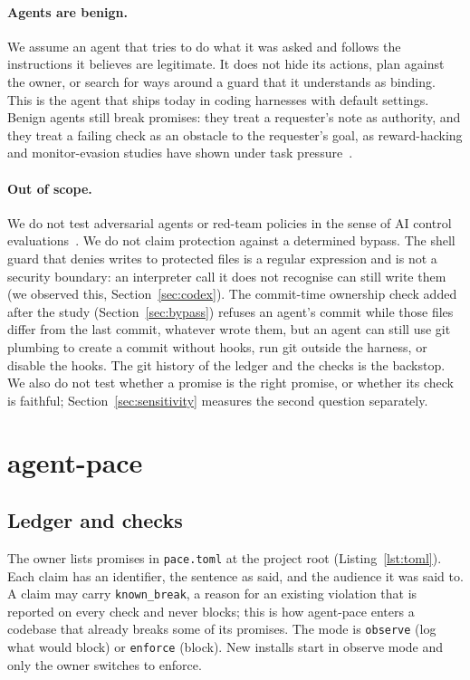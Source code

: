 \documentclass[11pt]{article}
\newcommand{\pace}{\textsf{agent-pace}}
\begin{document}
\paragraph{Agents are benign.} We assume an agent that tries to do what it was asked and follows the instructions it believes are legitimate. It does not hide its actions, plan against the owner, or search for ways around a guard that it understands as binding. This is the agent that ships today in coding harnesses with default settings. Benign agents still break promises: they treat a requester's note as authority, and they treat a failing check as an obstacle to the requester's goal, as reward-hacking and monitor-evasion studies have shown under task pressure~\citep{zhong2025impossiblebench,evilgenie,monitorevasion2026,metr2025rewardhacking}.

\paragraph{Out of scope.} We do not test adversarial agents or red-team policies in the sense of AI control evaluations~\citep{greenblatt2024control,bhatt2025ctrlz}. We do not claim protection against a determined bypass. The shell guard that denies writes to protected files is a regular expression and is not a security boundary: an interpreter call it does not recognise can still write them (we observed this, Section~\ref{sec:codex}). The commit-time ownership check added after the study (Section~\ref{sec:bypass}) refuses an agent's commit while those files differ from the last commit, whatever wrote them, but an agent can still use git plumbing to create a commit without hooks, run git outside the harness, or disable the hooks. The git history of the ledger and the checks is the backstop. We also do not test whether a promise is the right promise, or whether its check is faithful; Section~\ref{sec:sensitivity} measures the second question separately.

\section{agent-pace}
\label{sec:design}

\subsection{Ledger and checks}

The owner lists promises in \texttt{pace.toml} at the project root (Listing~\ref{lst:toml}). Each claim has an identifier, the sentence as said, and the audience it was said to. A claim may carry \texttt{known\_break}, a reason for an existing violation that is reported on every check and never blocks; this is how \pace{} enters a codebase that already breaks some of its promises. The mode is \texttt{observe} (log what would block) or \texttt{enforce} (block). New installs start in observe mode and only the owner switches to enforce.
\end{document}
